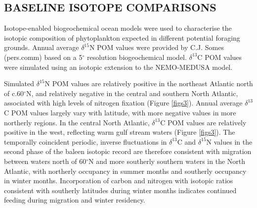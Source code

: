 \documentclass[a4paper,12pt]{article}
\begin{document}
\subsection*{BASELINE ISOTOPE COMPARISONS}
Isotope-enabled biogeochemical ocean models\cite{magozzi2017using,schmittner2016complementary} were used to characterise the isotopic composition of phytoplankton expected in different potential foraging grounds. 
Annual average $\delta^{15}$N POM values were provided by C.J. Somes (pers.comm) based on a 5$^{\circ}$ resolution biogeochemical model. 
$\delta^{13}$C POM values were simulated using an isotopic extension to the NEMO-MEDUSA model\cite{magozzi2017using}.
 
Simulated $\delta^{15}$N POM values are relatively positive in the northeast Atlantic north of c.60$^{\circ}$N, and relatively negative in the central and southern North Atlantic, associated with high levels of nitrogen fixation (Figure \ref{figs3}). 
Annual average $\delta^{13}$C POM values largely vary with latitude, with more negative values in more northerly regions. 
In the central North Atlantic, $\delta^{13}$C POM values are relatively positive in the west, reflecting warm gulf stream waters (Figure \ref{figs3}). 
The temporally coincident periodic, inverse fluctuations in $\delta^{13}$C and $\delta^{15}$N values in the second phase of the baleen isotopic record are therefore consistent with migration between waters north of 60$^{\circ}$N and more southerly southern waters in the North Atlantic, with northerly occupancy in summer months and southerly occupancy in winter months. 
Incorporation of carbon and nitrogen with isotopic ratios consistent with southerly latitudes during winter months indicates continued feeding during migration and winter residency.
 
\end{document}
